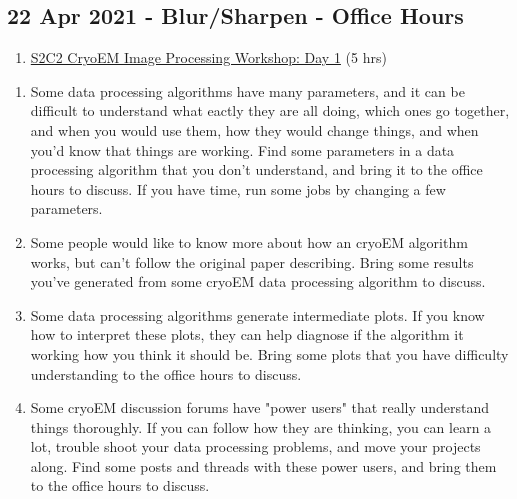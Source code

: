 \documentclass[11pt, oneside]{article}   	%
\begin{document}
\subsection{22 Apr 2021 - Blur/Sharpen - Office Hours }
\begin{enumerate}
	\item \href{https://youtu.be/eRPue0-Pkw4}{S2C2 CryoEM Image Processing Workshop: Day 1} (5 hrs)
	\end{enumerate}
\begin{enumerate}
	\item Some data processing algorithms have many parameters, and it can be difficult to understand what eactly they are all doing, which ones go together, and when you would use them, how they would change things, and when you'd know that things are working. Find some parameters in a data processing algorithm that you don't understand, and bring it to the office hours to discuss. If you have time, run some jobs by changing a few parameters.
	\item Some people would like to know more about how an cryoEM algorithm works, but can't follow the original paper describing. Bring some results you've generated from some cryoEM data processing algorithm to discuss.
	\item Some data processing algorithms generate intermediate plots. If you know how to interpret these plots, they can help diagnose if the algorithm it working how you think it should be. Bring some plots that you have difficulty understanding to the office hours to discuss.  
	\item Some cryoEM discussion forums have "power users" that really understand things thoroughly. If you can follow how they are thinking, you can learn a lot, trouble shoot your data processing problems, and move your projects along. Find some posts and threads with these power users, and bring them to the office hours to discuss.
\end{enumerate}
\end{document}
